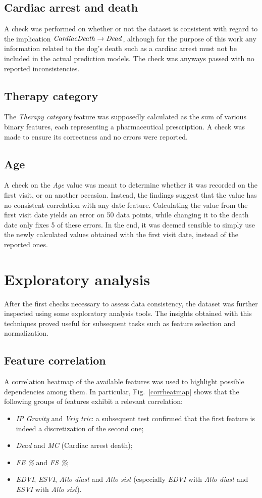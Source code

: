\documentclass[12pt]{report}
\begin{document}
\subsection*{Cardiac arrest and death}
A check was performed on whether or not the dataset is consistent with regard to the implication $ \text{\emph{CardiacDeath}} \rightarrow \text{\emph{Dead}} $, although for the purpose of this work any information related to the dog's death such as a cardiac arrest must not be included in the actual prediction models. The check was anyways passed with no reported inconsistencies.
\subsection*{Therapy category}
The \textit{Therapy category} feature was supposedly calculated as the sum of various binary features, each representing a pharmaceutical prescription. A check was made to ensure its correctness and no errors were reported.
\subsection*{Age}
A check on the \textit{Age} value was meant to determine whether it was recorded on the first visit, or on another occasion. Instead, the findings suggest that the value has no consistent correlation with any date feature. Calculating the value from the first visit date yields an error on 50 data points, while changing it to the death date only fixes 5 of these errors. In the end, it was deemed sensible to simply use the newly calculated values obtained with the first visit date, instead of the reported ones.

\section{Exploratory analysis} \label{explanal}
After the first checks necessary to assess data consistency, the dataset was further inspected using some exploratory analysis tools. The insights obtained with this techniques proved useful for subsequent tasks such as feature selection and normalization.
\subsection*{Feature correlation}
A correlation heatmap of the available features was used to highlight possible dependencies among them. In particular, Fig.\ \ref{corrheatmap} shows that the following groups of features exhibit a relevant correlation:
\begin{itemize}
\item \textit{IP Gravity} and \textit{Vrig tric}: a subsequent test confirmed that the first feature is indeed a discretization of the second one;
\item \textit{Dead} and \textit{MC} (Cardiac arrest death);
\item \textit{FE \%} and \textit{FS \%};
\item \textit{EDVI}, \textit{ESVI}, \textit{Allo diast} and \textit{Allo sist} (especially \textit{EDVI} with \textit{Allo diast} and \textit{ESVI} with \textit{Allo sist}).
\end{itemize}
\end{document}
